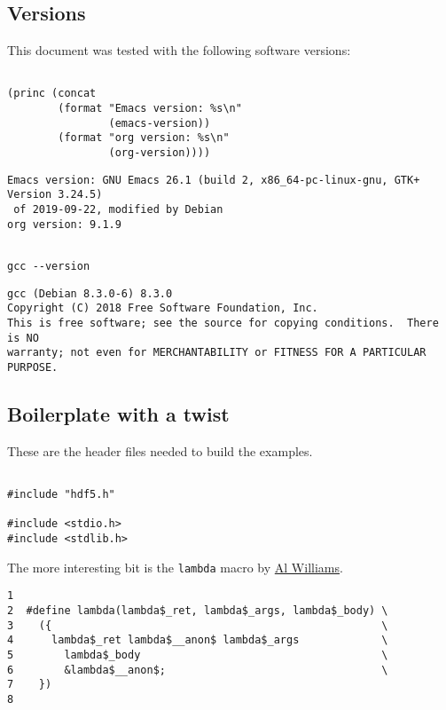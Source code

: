 \documentclass[a4paper, 12pt]{article}
\begin{document}
\subsection{Versions}
\label{sec:orga44ab7a}
This document was tested with the following software versions:

\begin{verbatim}

(princ (concat
        (format "Emacs version: %s\n"
                (emacs-version))
        (format "org version: %s\n"
                (org-version))))

\end{verbatim}

\begin{verbatim}
Emacs version: GNU Emacs 26.1 (build 2, x86_64-pc-linux-gnu, GTK+ Version 3.24.5)
 of 2019-09-22, modified by Debian
org version: 9.1.9
\end{verbatim}

\begin{verbatim}

gcc --version

\end{verbatim}

\begin{verbatim}
gcc (Debian 8.3.0-6) 8.3.0
Copyright (C) 2018 Free Software Foundation, Inc.
This is free software; see the source for copying conditions.  There is NO
warranty; not even for MERCHANTABILITY or FITNESS FOR A PARTICULAR PURPOSE.

\end{verbatim}

\subsection{Boilerplate with a twist}
\label{sec:org77e4cdd}

These are the header files needed to build the examples.

\begin{verbatim}

#include "hdf5.h"

#include <stdio.h>
#include <stdlib.h>

\end{verbatim}

The more interesting bit is the \texttt{lambda} macro by \href{https://hackaday.com/2019/09/11/lambdas-for-c-sort-of/}{Al Williams}.

\begin{verbatim}
1
2  #define lambda(lambda$_ret, lambda$_args, lambda$_body) \
3    ({                                                    \
4      lambda$_ret lambda$__anon$ lambda$_args             \
5        lambda$_body                                      \
6        &lambda$__anon$;                                  \
7    })
8
\end{verbatim}
\end{document}
